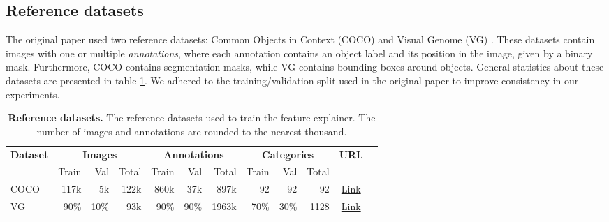 \subsection{Reference datasets} \label{sec:Reference datasets}
The original paper used two reference datasets: Common Objects in Context (COCO) \cite{coco} and Visual Genome (VG) \cite{krishna2017visual}. These datasets contain images with one or multiple \textit{annotations}, where each annotation contains an object label and its position in the image, given by a binary mask. Furthermore, COCO contains segmentation masks, while VG contains bounding boxes around objects. General statistics about these datasets are presented in table \ref{tab:datasets}. We adhered to the training/validation split used in the original paper to improve consistency in our experiments.

\begin{table}[b!]
    \centering
    \caption{\centering \textbf{Reference datasets.} The reference datasets used to train the feature explainer. The number of images and annotations are rounded to the nearest thousand.}
    \begin{tabular}{l r r r r r r r r r c c} \toprule
        \textbf{Dataset} & \multicolumn{3}{c}{\textbf{Images}} & \multicolumn{3}{c}{\textbf{Annotations}} & \multicolumn{3}{c}{\textbf{Categories}} & \textbf{URL} \\ \cmidrule(lr){2-4} \cmidrule(lr){5-7} \cmidrule(lr){8-10}
        & Train & Val & Total & Train & Val & Total & Train & Val & Total & & \\ \midrule
        COCO & 117k & 5k & 122k & 860k & 37k & 897k & 92 & 92 & 92 & \href{https://cocodataset.org/}{Link} \\
        VG & 90\% & 10\% & 93k & 90\% & 90\% & 1963k & 70\% & 30\% & 1128 & \href{http://visualgenome.org/}{Link} \\
    \bottomrule \end{tabular}
    \label{tab:datasets}
\end{table}

